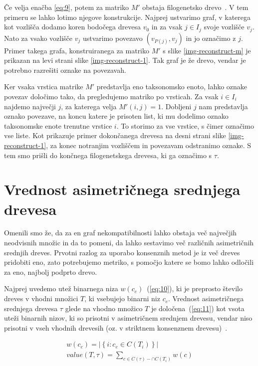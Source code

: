 \documentclass[a4paper, 12pt]{book}
\begin{document}
\noindent Če velja enačba \ref{eq:9}, potem za matriko $M'$ obstaja filogenetsko 
drevo~\cite{gd}. V tem primeru se lahko lotimo njegove konstrukcije. Najprej 
ustvarimo graf, v katerega kot vozlišča dodamo koren bodočega drevesa $v_0$ in za 
vsak $j \in I_j$ svoje vozlišče $v_j$. Nato za vsako vozlišče $v_j$ ustvarimo
povezavo $(v_{P(j)}, v_j)$ in jo označimo z $j$. Primer takega
grafa, konstruiranega za matriko $M'$ s slike \ref{img-reconstruct-m} je prikazan
na levi strani slike \ref{img-reconstruct-1}. Tak graf je že drevo, vendar je potrebno 
razrešiti oznake na povezavah.

Ker vsaka vrstica matrike $M'$ predstavlja eno taksonomsko enoto, lahko oznake povezav
določimo tako, da pregledujemo matriko po vrsticah. Za vsak $i \in I_i$ najdemo največji 
$j$, za katerega velja $M'(i, j) = 1$. Dobljeni $j$ nam predstavlja oznako povezave, 
na koncu katere je prisoten list, ki mu dodelimo oznako taksonomske enote trenutne
vrstice $i$. To storimo za vse vrstice, s čimer označimo vse liste. Kot prikazuje 
primer dokončanega drevesa na desni strani slike \ref{img-reconstruct-1}, za konec 
notranjim vozliščem in povezavam odstranimo oznake. S tem smo prišli do končnega 
filogenetskega drevesa, ki ga označimo s $\tau$.  

\section{Vrednost asimetričnega srednjega drevesa}
Omenili smo že, da za en graf nekompatibilnosti lahko obstaja več največjih 
neodvisnih množic in da to pomeni, da lahko sestavimo več različnih 
asimetričnih srednjih dreves. Prvotni razlog za uporabo konsenznih metod 
je iz več dreves pridobiti eno, zato potrebujemo metriko, s pomočjo 
katere se bomo lahko odločili za eno, najbolj podprto drevo.  

Najprej uvedemo utež binarnega niza $w(c_e)$~(\ref{eq:10}), ki je preprosto 
število dreves v vhodni množici $T$, ki vsebujejo binarni niz $c_e$. Vrednost 
asimetričnega srednjega drevesa $\tau$ glede na vhodno množico $T$ je 
določena~(\ref{eq:11}) kot vsota uteži binarnih nizov, ki so prisotni v 
asimetričnem srednjem drevesu, vendar niso prisotni v vseh vhodnih drevesih 
(oz. v striktnem konsenznem drevesu)~\cite{pw}.

\begin{align}
	w(c_e) = \left| \left\{ i: c_e \in C(T_i) \right\} \right| \label{eq:10} \\
	value(T, \tau) = \sum_{c \in C(\tau) - \cap C(T_i)} w(c) \label{eq:11}
\end{align}
\end{document}
